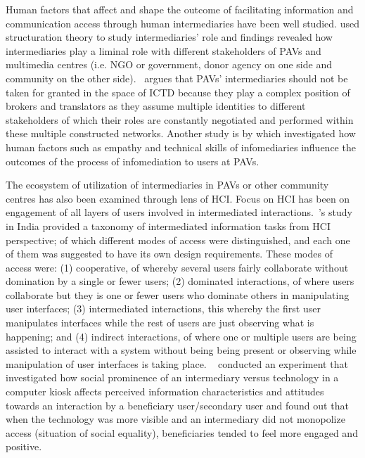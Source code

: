 Human factors that affect and shape the outcome of facilitating information and communication access through human intermediaries have been well studied. \cite{bailur2010liminal} used structuration theory\citep{jones2008giddens} to study intermediaries' role and findings revealed how intermediaries play a liminal role with different stakeholders of PAVs and multimedia centres (i.e. NGO or government, donor agency on one side and community on the other side).~\cite{bailur2012complex} argues that PAVs' intermediaries should not be taken for granted in the space of ICTD because they play a complex position of brokers and translators as they assume multiple identities to different stakeholders of which their roles are constantly negotiated and performed within these multiple constructed networks. Another study is by \cite{ramirez2013infomediaries} which investigated how human factors such as empathy and technical skills of infomediaries influence the outcomes of the process of infomediation to users at PAVs. 

The ecosystem of utilization of intermediaries in PAVs or other community centres has also been examined through lens of HCI. Focus on HCI has been on engagement of all layers of users involved in intermediated interactions.~\cite{parikh2006}'s study in India provided a taxonomy of intermediated information tasks from HCI perspective; of which different modes of access were distinguished, and each one of them was suggested to have its own design requirements. These modes of access were: (1) cooperative, of whereby several users fairly collaborate without domination by a single or fewer users; (2) dominated interactions, of where users collaborate but they is one or fewer users who dominate others in manipulating user interfaces; (3) intermediated interactions, this whereby the first user manipulates interfaces while the  rest of users are just observing what is happening; and (4) indirect interactions, of where one or multiple users are being assisted to interact with a system without being being present or observing while manipulation of user interfaces is taking place. ~\cite{sukumaran2009intermediated} conducted an experiment that investigated how social prominence of an intermediary versus technology in a computer kiosk affects perceived information characteristics and attitudes towards an interaction by a beneficiary user/secondary user and found out that when the technology was more visible and an intermediary did not monopolize access (situation of social equality), beneficiaries tended to feel more engaged and positive. 

